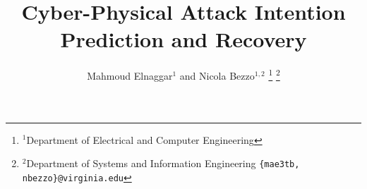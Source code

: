 \documentclass[letterpaper, 10 pt, conference]{ieeeconf}  %
\newcommand*{\affmark}[1][*]{\textsuperscript{#1}}
\begin{document}
\title{Cyber-Physical Attack Intention Prediction and Recovery}




\author{Mahmoud Elnaggar$^{1}$ and Nicola Bezzo$^{1,2}$%
\thanks{$^{1}$Department of Electrical and Computer Engineering}
\thanks{$^{2}$Department of Systems and Information Engineering
        {\tt\small  \{mae3tb, nbezzo\}@virginia.edu}}%
}


\maketitle
\end{document}
